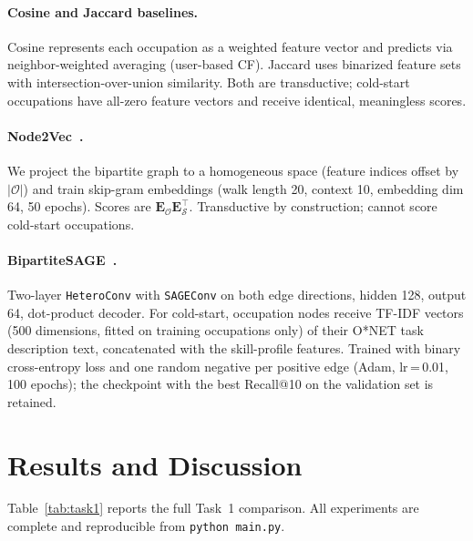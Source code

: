 \documentclass{article}
\begin{document}
\paragraph{Cosine and Jaccard baselines.}
Cosine represents each occupation as a weighted feature vector and predicts
via neighbor-weighted averaging (user-based CF).
Jaccard uses binarized feature sets with intersection-over-union similarity.
Both are transductive; cold-start occupations have all-zero feature vectors
and receive identical, meaningless scores.

\paragraph{Node2Vec~\cite{grover2016node2vec}.}
We project the bipartite graph to a homogeneous space (feature indices
offset by $|\mathcal{O}|$) and train skip-gram embeddings
(walk length 20, context 10, embedding dim 64, 50 epochs).
Scores are $\mathbf{E}_\mathcal{O}\mathbf{E}_\mathcal{S}^\top$.
Transductive by construction; cannot score cold-start occupations.

\paragraph{BipartiteSAGE~\cite{hamilton2017inductive}.}
Two-layer \texttt{HeteroConv} with \texttt{SAGEConv} on both edge
directions, hidden 128, output 64, dot-product decoder.
For cold-start, occupation nodes receive TF-IDF vectors (500 dimensions,
fitted on training occupations only) of their O*NET task description text,
concatenated with the skill-profile features.
Trained with binary cross-entropy loss and one random negative per positive
edge (Adam, lr\,=\,0.01, 100 epochs); the checkpoint with the best Recall@10
on the validation set is retained.

\section{Results and Discussion}

Table~\ref{tab:task1} reports the full Task~1 comparison.
All experiments are complete and reproducible from \texttt{python main.py}.
\end{document}
